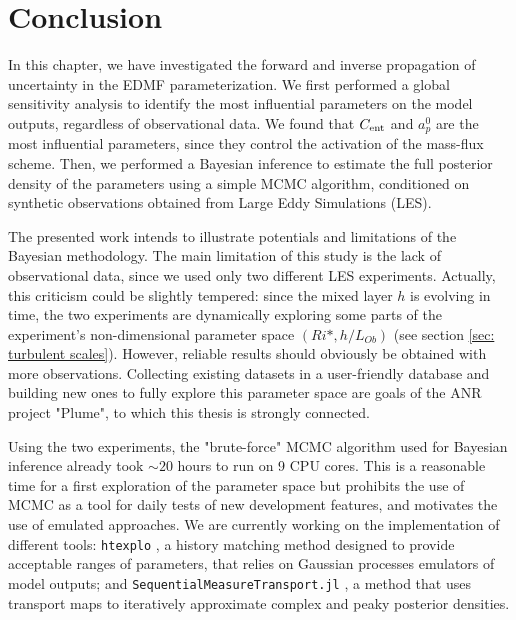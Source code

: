 \documentclass[draft]{agujournal2019}
\begin{document}
\section{Conclusion}
%
In this chapter, we have investigated the forward and inverse propagation of uncertainty in the EDMF parameterization. We first performed a global sensitivity analysis to identify the most influential parameters on the model outputs, regardless of observational data. We found that $C_{\rm ent}$ and $a_p^0$ are the most influential parameters, since they control the activation of the mass-flux scheme. Then, we performed a Bayesian inference to estimate the full posterior density of the parameters using a simple MCMC algorithm, conditioned on synthetic observations obtained from Large Eddy Simulations (LES). 
\par The presented work intends to illustrate potentials and limitations of the Bayesian methodology. The main limitation of this study is the lack of observational data, since we used only two different LES experiments. Actually, this criticism could be slightly tempered: since the mixed layer $h$ is evolving in time, the two experiments are dynamically exploring some parts of the experiment's non-dimensional parameter space $(Ri*,h/L_{Ob})$ (see section \ref{sec: turbulent scales}). However, reliable results should obviously be obtained with more observations. Collecting existing datasets \cite{vanroekel_kpp_2018,wagner_formulation_,garanaik_new_2024} in a user-friendly database and building new ones to fully explore this parameter space are goals of the ANR project "Plume", to which this thesis is strongly connected. 
%
\par Using the two experiments, the "brute-force" MCMC algorithm used for Bayesian inference already took $\sim 20$ hours to run on 9 CPU cores. This is a reasonable time for a first exploration of the parameter space but prohibits the use of MCMC as a tool for daily tests of new development features, and motivates the use of emulated approaches. We are currently working on the implementation of different tools: \texttt{htexplo} \cite{couvreux_processbased_2021}, a history matching method designed to provide acceptable ranges of parameters, that relies on Gaussian processes emulators of model outputs; and \texttt{SequentialMeasureTransport.jl} \cite{zanger_sequential_2024}, a method that uses transport maps to iteratively approximate complex and peaky posterior densities.   
%
\end{document}
